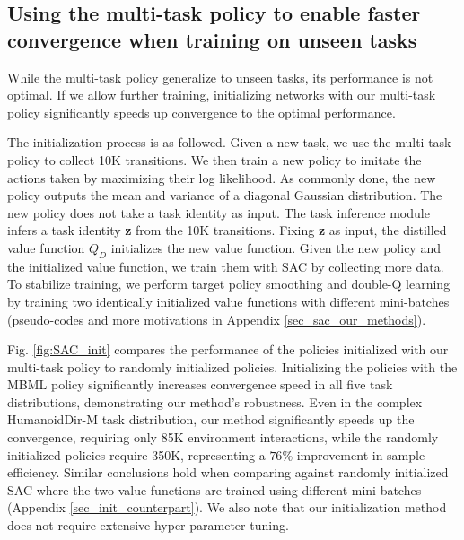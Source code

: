 \subsection{Using the multi-task policy to enable faster convergence when training on unseen tasks}\label{sec_exp_init_sac}

While the multi-task policy generalize to unseen tasks, its performance is not optimal. If we allow further training,
initializing networks with our multi-task policy significantly speeds up convergence to the optimal performance.

The initialization process is as followed. Given a new task, we use the multi-task policy to collect 10K transitions.
We then train a new policy to imitate the actions taken by maximizing their log likelihood. As commonly done, the new policy outputs the mean and variance of a diagonal Gaussian distribution. The new policy does not take a task identity as input. The task inference module infers a task identity {\bf z} from the 10K transitions. Fixing {\bf z} as input, the distilled value function $Q_D$ initializes the new value function. Given the new policy and the initialized value function,
we train them with SAC by collecting more data.
To stabilize training, we perform target policy smoothing \cite{TD3} and double-Q learning \cite{van2016deep} by training two identically initialized value functions with different mini-batches (pseudo-codes and more motivations in Appendix \ref{sec_sac_our_methods}).

Fig. \ref{fig:SAC_init} compares the performance of the policies initialized with our multi-task policy to randomly initialized policies.
Initializing the policies with the MBML policy significantly increases convergence speed in all five task distributions, demonstrating our method's robustness.
Even in the complex HumanoidDir-M task distribution, our method significantly speeds up the convergence, requiring only 85K environment interactions, while the randomly initialized policies require 350K, representing a $76\%$ improvement in sample efficiency.
Similar conclusions hold when comparing against randomly initialized SAC where the two value functions are trained using different mini-batches (Appendix \ref{sec_init_counterpart}).
We also note that our initialization method does not require extensive hyper-parameter tuning.


